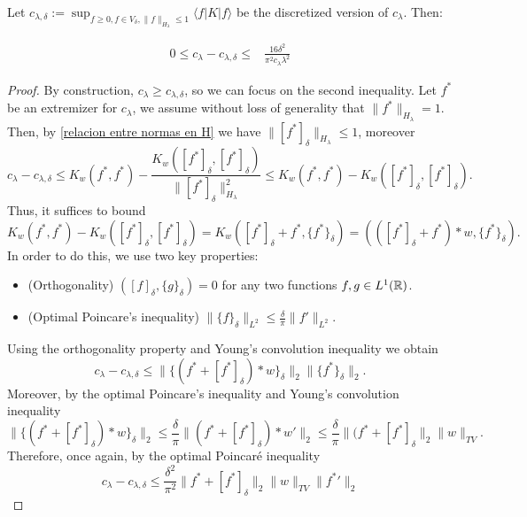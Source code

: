 \begin{proposition}\label{bounding the error}
    Let $c_{\lambda,\delta}:= \sup_{f\ge 0, f\in V_\delta,\|f\|_{H_{\lambda}}\le 1} \langle f |K|f\rangle$ be the discretized version of $c_{\lambda}$. Then:

    \begin{align}
0 \le c_\lambda-c_{\lambda,\delta} \le& \frac{16\delta^2}{\pi^2c_{\lambda}\lambda^2}
\end{align}

\begin{proof}
By construction, $c_\lambda\ge c_{\lambda,\delta}$, so we can focus on the second inequality. Let $f^*$ be an extremizer for $c_\lambda$, we assume without loss of generality that $\|f^*\|_{H_{\lambda}}=1$.
Then, by \eqref{relacion entre normas  en H} we have $\|[f^*]_{\delta}\|_{H_{\lambda}}\leq 1$, moreover
$$
c_{\lambda}-c_{\lambda,\delta}\leq K_w(f^*,f^*) - \frac{K_w([f^*]_\delta, [f^*]_\delta)}{\|[f^*]_{\delta}\|^2_{H_{\lambda}}}\leq K_w(f^*,f^*) - K_w([f^*]_\delta, [f^*]_\delta).
$$
Thus, it suffices to bound 
$$
K_w(f^*,f^*) - K_w([f^*]_\delta, [f^*]_\delta) = K_w([f^*]_\delta + f^*, \{f^*\}_\delta)  = (([f^*]_\delta + f^*)\ast w, \{f^*\}_{\delta}).
$$
In order to do this, we use two key properties: 
\begin{itemize}
    \item (Orthogonality) $([f]_{\delta},\{g\}_{\delta})=0$ for any two functions $f,g\in L^{1}({\mathbb R})$.
    \item (Optimal Poincare's inequality) $\|\{f\}_{\delta}\|_{L^2}\le \frac \delta {\pi} \|f'\|_{L^2} $.
\end{itemize}

Using the orthogonality property and Young's convolution inequality we obtain
$$
c_\lambda-c_{\lambda,\delta} \le \|\{(f^* +[f^*]_\delta)\ast w\}_\delta\|_2 \|\{f^*\}_{\delta}\|_2.
$$
Moreover, by the optimal Poincare's inequality and Young's convolution inequality
$$
\|\{(f^* +[f^*]_\delta)\ast w\}_\delta\|_2\leq 
\frac{\delta}{\pi} \|(f^* +[f^*]_\delta)*w'\|_2
\leq \frac{\delta}{\pi}\|(f^* +[f^*]_\delta\|_2\|w\|_{TV}.
$$
Therefore, once again, by the optimal Poincaré inequality %
$$
c_\lambda-c_{\lambda,\delta} \le \frac{\delta^2}{\pi^2}\|f^* +[f^*]_\delta\|_2\| w\|_{TV} \|{f^*}'\|_2
$$


\end{proof}
\end{proposition}
